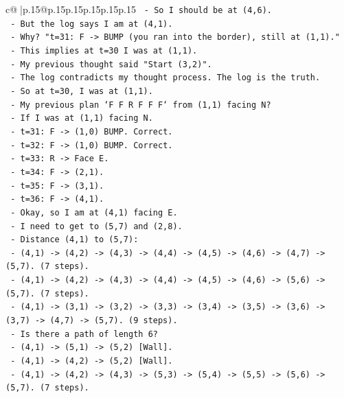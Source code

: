 \documentclass{article}
\begin{document}
{\begin{supertabular}{c@{$\;$}|p{.15\linewidth}@{}p{.15\linewidth}p{.15\linewidth}p{.15\linewidth}p{.15\linewidth}p{.15\linewidth}}
{{{\texttt{     {-} So I should be at (4,6).} \\
\texttt{     {-} But the log says I am at (4,1).} \\
\texttt{     {-} Why? "t=31: F {-}> BUMP (you ran into the border), still at (1,1)."} \\
\texttt{     {-} This implies at t=30 I was at (1,1).} \\
\texttt{     {-} My previous thought said "Start (3,2)".} \\
\texttt{     {-} The log contradicts my thought process. The log is the truth.} \\
\texttt{     {-} So at t=30, I was at (1,1).} \\
\texttt{     {-} My previous plan `F F R F F F` from (1,1) facing N?} \\
\texttt{       {-} If I was at (1,1) facing N.} \\
\texttt{       {-} t=31: F {-}> (1,0) BUMP. Correct.} \\
\texttt{       {-} t=32: F {-}> (1,0) BUMP. Correct.} \\
\texttt{       {-} t=33: R {-}> Face E.} \\
\texttt{       {-} t=34: F {-}> (2,1).} \\
\texttt{       {-} t=35: F {-}> (3,1).} \\
\texttt{       {-} t=36: F {-}> (4,1).} \\
\texttt{     {-} Okay, so I am at (4,1) facing E.} \\
\texttt{     {-} I need to get to (5,7) and (2,8).} \\
\texttt{     {-} Distance (4,1) to (5,7):} \\
\texttt{       {-} (4,1) {-}> (4,2) {-}> (4,3) {-}> (4,4) {-}> (4,5) {-}> (4,6) {-}> (4,7) {-}> (5,7). (7 steps).} \\
\texttt{       {-} (4,1) {-}> (4,2) {-}> (4,3) {-}> (4,4) {-}> (4,5) {-}> (4,6) {-}> (5,6) {-}> (5,7). (7 steps).} \\
\texttt{       {-} (4,1) {-}> (3,1) {-}> (3,2) {-}> (3,3) {-}> (3,4) {-}> (3,5) {-}> (3,6) {-}> (3,7) {-}> (4,7) {-}> (5,7). (9 steps).} \\
\texttt{     {-} Is there a path of length 6?} \\
\texttt{       {-} (4,1) {-}> (5,1) {-}> (5,2) {[}Wall{]}.} \\
\texttt{       {-} (4,1) {-}> (4,2) {-}> (5,2) {[}Wall{]}.} \\
\texttt{       {-} (4,1) {-}> (4,2) {-}> (4,3) {-}> (5,3) {-}> (5,4) {-}> (5,5) {-}> (5,6) {-}> (5,7). (7 steps).} \\
}}}
\end{supertabular}}
\end{document}
